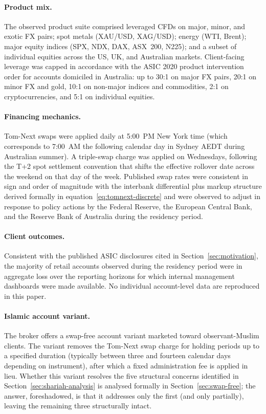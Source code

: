 \documentclass[preprint,12pt,authoryear]{elsarticle}
\theoremstyle{definition}
\begin{document}
\paragraph{Product mix.}
The observed product suite comprised leveraged CFDs on major, minor,
and exotic FX pairs; spot metals (XAU/USD, XAG/USD); energy
(WTI, Brent); major equity indices (SPX, NDX, DAX, ASX~200, N225);
and a subset of individual equities across the US, UK, and Australian
markets. Client-facing leverage was capped in accordance with the ASIC
2020 product intervention order for accounts domiciled in Australia:
up to 30:1 on major FX pairs, 20:1 on minor FX and gold, 10:1 on
non-major indices and commodities, 2:1 on cryptocurrencies, and 5:1 on
individual equities.

\paragraph{Financing mechanics.}
Tom-Next swaps were applied daily at 5:00~PM New York time (which
corresponds to 7:00~AM the following calendar day in Sydney AEDT
during Australian summer). A triple-swap charge was applied on
Wednesdays, following the T+2 spot settlement convention that shifts
the effective rollover date across the weekend on that day of the
week. Published swap rates were consistent in sign and order of
magnitude with the interbank differential plus markup structure
derived formally in equation~\eqref{eq:tomnext-discrete} and were
observed to adjust in response to policy actions by the Federal
Reserve, the European Central Bank, and the Reserve Bank of Australia
during the residency period.

\paragraph{Client outcomes.}
Consistent with the published ASIC disclosures cited in
Section~\ref{sec:motivation}, the majority of retail accounts observed
during the residency period were in aggregate loss over the reporting
horizons for which internal management dashboards were made available.
No individual account-level data are reproduced in this paper.

\paragraph{Islamic account variant.}
The broker offers a swap-free account variant marketed toward
observant-Muslim clients. The variant removes the Tom-Next swap charge
for holding periods up to a specified duration (typically between
three and fourteen calendar days depending on instrument), after which
a fixed administration fee is applied in lieu. Whether this variant
resolves the five structural concerns identified in
Section~\ref{sec:shariah-analysis} is analysed formally in
Section~\ref{sec:swap-free}; the answer, foreshadowed, is that it
addresses only the first (and only partially), leaving the remaining
three structurally intact.
\end{document}
